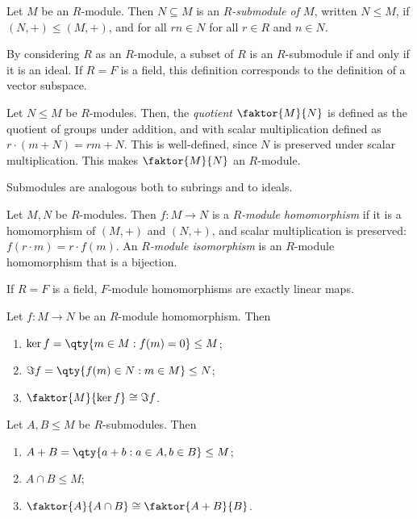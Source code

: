 \begin{definition}
	Let $M$ be an $R$-module.
	Then $N \subseteq M$ is an \textit{$R$-submodule of $M$}, written $N \leq M$, if $(N, +) \leq (M, +)$, and for all $rn \in N$ for all $r \in R$ and $n \in N$.
\end{definition}
\begin{example}
	By considering $R$ as an $R$-module, a subset of $R$ is an $R$-submodule if and only if it is an ideal.
	If $R = F$ is a field, this definition corresponds to the definition of a vector subspace.
\end{example}
\begin{definition}
	Let $N \leq M$ be $R$-modules.
	Then, the \textit{quotient} $\faktor{M}{N}$ is defined as the quotient of groups under addition, and with scalar multiplication defined as $r \cdot (m + N) = rm + N$.
	This is well-defined, since $N$ is preserved under scalar multiplication.
	This makes $\faktor{M}{N}$ an $R$-module.
\end{definition}
\begin{remark}
	Submodules are analogous both to subrings and to ideals.
\end{remark}
\begin{definition}
	Let $M, N$ be $R$-modules.
	Then $f : M \to N$ is a \textit{$R$-module homomorphism} if it is a homomorphism of $(M, +)$ and $(N, +)$, and scalar multiplication is preserved: $f(r \cdot m) = r \cdot f(m)$.
	An \textit{$R$-module isomorphism} is an $R$-module homomorphism that is a bijection.
\end{definition}
\begin{example}
	If $R = F$ is a field, $F$-module homomorphisms are exactly linear maps.
\end{example}
\begin{theorem}
	Let $f : M \to N$ be an $R$-module homomorphism.
	Then
	\begin{enumerate}
		\item $\ker f = \qty{m \in M : f(m) = 0} \leq M$;
		\item $\Im f = \qty{f(m) \in N : m \in M} \leq N$;
		\item $\faktor{M}{\ker f} \cong \Im f$.
	\end{enumerate}
\end{theorem}
\begin{theorem}
	Let $A, B \leq M$ be $R$-submodules.
	Then
	\begin{enumerate}
		\item $A + B = \qty{a + b : a \in A, b \in B} \leq M$;
		\item $A \cap B \leq M$;
		\item $\faktor{A}{A \cap B} \cong \faktor{A + B}{B}$.
	\end{enumerate}
\end{theorem}

